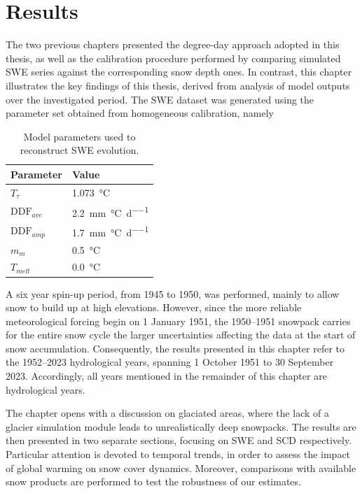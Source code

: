 \chapter{Results}
\label{cap:results}

The two previous chapters presented the degree-day approach adopted in this thesis, as well as the calibration procedure 
performed by comparing simulated SWE series against  the corresponding snow depth ones. In contrast, this chapter illustrates the key findings of 
this thesis, derived from analysis of model outputs over the investigated period. The SWE dataset was generated using the parameter set obtained 
from homogeneous calibration, namely
\begin{table}[H]
  \centering
  \caption{Model parameters used to reconstruct SWE evolution.}
  \label{tab:optimal_homo_parameter}
  \renewcommand{\arraystretch}{1.3}
  \begin{tabular}{@{} >{\raggedright\arraybackslash}m{3.0cm} >{\raggedright\arraybackslash}m{3.5cm} @{}}
    \toprule
    \textbf{Parameter} & \textbf{Value} \\
    \midrule
    $T_{\tau}$ & \SI{1.073}{\degreeCelsius} \\
    $\text{DDF}_{ave}$ & \SI{2.2}{\milli\meter\per\degreeCelsius\per\day}\\
    $\text{DDF}_{amp}$ & \SI{1.7}{\milli\meter\per\degreeCelsius\per\day}\\
    $m_m$ & \SI{0.5}{\degreeCelsius} \\
    $T_{melt}$ & \SI{0.0}{\degreeCelsius} \\
    \bottomrule
  \end{tabular}
\end{table}
A six year spin-up period, from 1945 to 1950, was performed, mainly to allow snow to build up at high elevations. However, since the more reliable 
meteorological forcing begin on 1 January 1951, the 1950--1951 snowpack carries for the entire snow cycle the larger uncertainties affecting the 
data at the start of snow accumulation. Consequently, the results presented in this chapter refer to the 1952--2023 hydrological years, spanning 1 
October 1951 to 30 September 2023. Accordingly, all years mentioned in the remainder of this chapter are hydrological years.

The chapter opens with a discussion on glaciated areas, where the lack of a glacier simulation module leads to unrealistically deep snowpacks. 
The results are then presented in two separate sections, focusing on SWE and SCD respectively. Particular attention is devoted to temporal trends, 
in order to assess the impact of global warming on snow cover dynamics. Moreover, comparisons with available snow products are performed to 
test the robustness of our estimates. 










